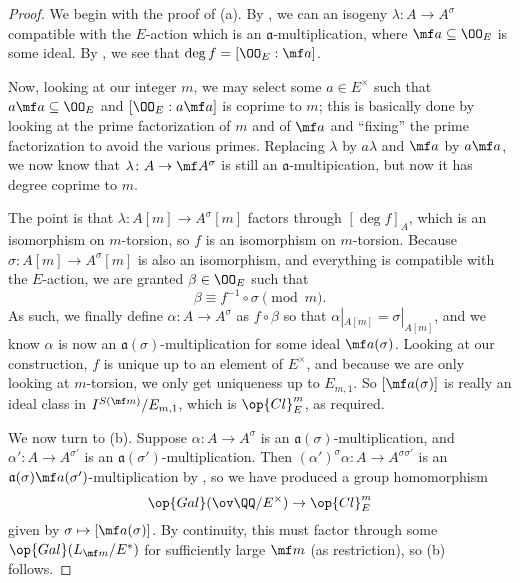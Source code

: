 \documentclass[../notes.tex]{subfiles}
\begin{document}
\begin{proof}
	We begin with the proof of (a). By , we can an isogeny $\lambda\colon A\to A^\sigma$ compatible with the $E$-action which is an $\mathfrak a$-multiplication, where $\mf a\subseteq\OO_E$ is some ideal. By , we see that $\deg f=[\OO_E:\mf a]$.

	Now, looking at our integer $m$, we may select some $a\in E^\times$ such that $a\mf a\subseteq\OO_E$ and $[\OO_E:a\mf a]$ is coprime to $m$; this is basically done by looking at the prime factorization of $m$ and of $\mf a$ and ``fixing'' the prime factorization to avoid the various primes. Replacing $\lambda$ by $a\lambda$ and $\mf a$ by $a\mf a$, we now know that $\lambda\colon A\to\mf A^\sigma$ is still an $\mathfrak a$-multipication, but now it has degree coprime to $m$.

	The point is that $\lambda\colon A[m]\to A^\sigma[m]$ factors through $[\deg f]_A$, which is an isomorphism on $m$-torsion, so $f$ is an isomorphism on $m$-torsion. Because $\sigma\colon A[m]\to A^\sigma[m]$ is also an isomorphism, and everything is compatible with the $E$-action, we are granted $\beta\in\OO_E$ such that
	\[\beta\equiv f^{-1}\circ\sigma\pmod m.\]
	As such, we finally define $\alpha\colon A\to A^\sigma$ as $f\circ\beta$ so that $\alpha|_{A[m]}=\sigma|_{A[m]}$, and we know $\alpha$ is now an $\mathfrak a(\sigma)$-multiplication for some ideal $\mf a(\sigma)$. Looking at our construction, $f$ is unique up to an element of $E^\times$, and because we are only looking at $m$-torsion, we only get uniqueness up to $E_{m,1}$. So $[\mf a(\sigma)]$ is really an ideal class in $I^{S(\mf m)}/E_{m,1}$, which is $\op{Cl}^m_E$, as required.

	We now turn to (b). Suppose $\alpha\colon A\to A^\sigma$ is an $\mathfrak a(\sigma)$-multiplication, and $\alpha'\colon A\to A^{\sigma'}$ is an $\mathfrak a(\sigma')$-multiplication. Then $(\alpha')^\sigma\alpha\colon A\to A^{\sigma\sigma'}$ is an $\mathfrak a(\sigma)\mf a(\sigma')$-multiplication by , so we have produced a group homomorphism
	\[\op{Gal}(\ov\QQ/E^\times)\to\op{Cl}^m_E\]
	given by $\sigma\mapsto[\mf a(\sigma)]$. By continuity, this must factor through some $\op{Gal}(L_{\mf m}/E^*)$ for sufficiently large $\mf m$ (as restriction), so (b) follows.
\end{proof}
\end{document}
